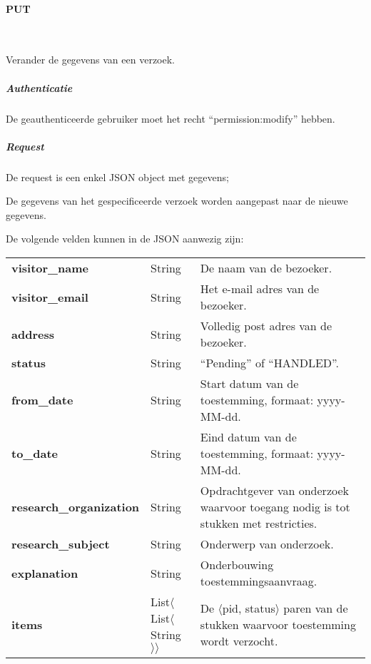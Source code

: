 \documentclass[a4paper,titlepage]{report}
\makeatletter
\def\namedlabel#1#2{
  \label{#1}
  \begingroup
   \def\@currentlabel{#2}%
   \label{#1:name}\endgroup
}
\makeatother
\begin{document}
        \paragraph{PUT}\hfill\\
          \namedlabel{api:permission:put}{PUT /permission/[id]}
          Verander de gegevens van een verzoek.

          \subparagraph{Authenticatie}
            De geauthenticeerde gebruiker moet het recht ``permission:modify''
            hebben.

          \subparagraph{Request}
            De request is een enkel JSON object met gegevens;

            De gegevens van het gespecificeerde verzoek worden aangepast
            naar de nieuwe gegevens.

            De volgende velden kunnen in de JSON aanwezig zijn:\\

            \begin{tabular}{ l l p{10cm} }
              \textbf{visitor\_name} & String & De naam van de bezoeker. \\
              \textbf{visitor\_email} & String & Het e-mail adres van de
              bezoeker. \\
              \textbf{address} & String & Volledig post adres van de bezoeker.
              \\
              \textbf{status} & String & ``Pending'' of ``HANDLED''. \\
              \textbf{from\_date} & String & Start datum van de toestemming,
              formaat: yyyy-MM-dd. \\
              \textbf{to\_date} & String & Eind datum van de toestemming,
              formaat: yyyy-MM-dd. \\
              \textbf{research\_organization} & String & Opdrachtgever van
              onderzoek waarvoor toegang nodig is tot stukken met restricties.
              \\
              \textbf{research\_subject} & String & Onderwerp van onderzoek. \\
              \textbf{explanation} & String & Onderbouwing toestemmingsaanvraag.
              \\
              \textbf{items} & List$\langle$List$\langle$String$\rangle\rangle$
              & De $\langle$pid, status$\rangle$ paren van de stukken waarvoor
              toestemming wordt verzocht.\\
            \end{tabular}
\end{document}
